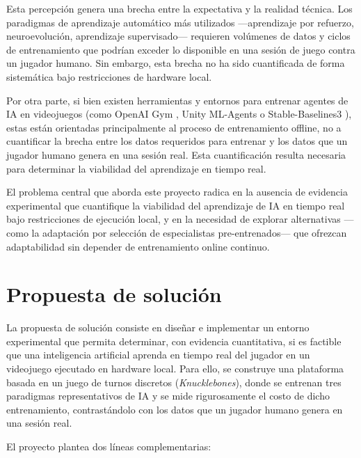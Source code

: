 Esta percepción genera una brecha entre la expectativa y la realidad técnica. Los paradigmas de aprendizaje automático más utilizados ---aprendizaje por refuerzo, neuroevolución, aprendizaje supervisado--- requieren volúmenes de datos y ciclos de entrenamiento que podrían exceder lo disponible en una sesión de juego contra un jugador humano. Sin embargo, esta brecha no ha sido cuantificada de forma sistemática bajo restricciones de hardware local.

Por otra parte, si bien existen herramientas y entornos para entrenar agentes de IA en videojuegos (como OpenAI Gym \cite{brockman2016openai}, Unity ML-Agents \cite{juliani2018mlagents} o Stable-Baselines3 \cite{raffin2021sb3}), estas están orientadas principalmente al proceso de entrenamiento offline, no a cuantificar la brecha entre los datos requeridos para entrenar y los datos que un jugador humano genera en una sesión real. Esta cuantificación resulta necesaria para determinar la viabilidad del aprendizaje en tiempo real.

El problema central que aborda este proyecto radica en la ausencia de evidencia experimental que cuantifique la viabilidad del aprendizaje de IA en tiempo real bajo restricciones de ejecución local, y en la necesidad de explorar alternativas ---como la adaptación por selección de especialistas pre-entrenados--- que ofrezcan adaptabilidad sin depender de entrenamiento online continuo.

\section{Propuesta de solución}

La propuesta de solución consiste en diseñar e implementar un entorno experimental que permita determinar, con evidencia cuantitativa, si es factible que una inteligencia artificial aprenda en tiempo real del jugador en un videojuego ejecutado en hardware local. Para ello, se construye una plataforma basada en un juego de turnos discretos (\textit{Knucklebones}), donde se entrenan tres paradigmas representativos de IA y se mide rigurosamente el costo de dicho entrenamiento, contrastándolo con los datos que un jugador humano genera en una sesión real.

El proyecto plantea dos líneas complementarias:

